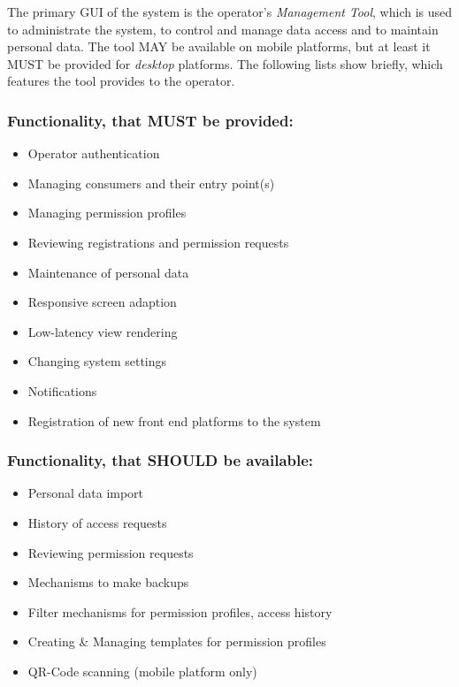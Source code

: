 \documentclass[12pt,english,a4paper,titlepage,cleardoublepage=empty,dottedtoc]{report}
\providecommand{\tightlist}{%
  \setlength{\itemsep}{0pt}\setlength{\parskip}{0pt}}
\begin{document}
The primary GUI of the system is the operator's \emph{Management Tool},
which is used to administrate the system, to control and manage data
access and to maintain personal data. The tool MAY be available on
mobile platforms, but at least it MUST be provided for \emph{desktop}
platforms. The following lists show briefly, which features the tool
provides to the operator.

\subsubsection{Functionality, that MUST be
provided:}\label{functionality-that-must-be-provided}

\begin{itemize}
\tightlist
\item
  Operator authentication
\item
  Managing consumers and their entry point(s)
\item
  Managing permission profiles
\item
  Reviewing registrations and permission requests
\item
  Maintenance of personal data
\item
  Responsive screen adaption
\item
  Low-latency view rendering
\item
  Changing system settings
\item
  Notifications
\item
  Registration of new front end platforms to the system
\end{itemize}

\subsubsection{Functionality, that SHOULD be
available:}\label{functionality-that-should-be-available}

\begin{itemize}
\tightlist
\item
  Personal data import
\item
  History of access requests
\item
  Reviewing permission requests
\item
  Mechanisms to make backups
\item
  Filter mechanisms for permission profiles, access history
\item
  Creating \& Managing templates for permission profiles
\item
  QR-Code scanning (mobile platform only)
\end{itemize}
\end{document}
